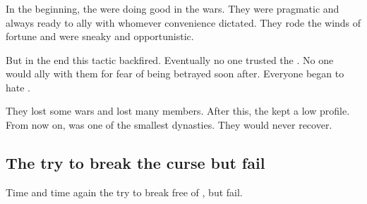\subsubsection{\TiphredSerah}
In the beginning, the \TiphredSerah were doing good in the wars.
They were pragmatic and always ready to ally with whomever convenience dictated.
They rode the winds of fortune and were sneaky and opportunistic. 

But in the end this tactic backfired.
Eventually no one trusted the \TiphredSerah.
No one would ally with them for fear of being betrayed soon after. 
Everyone began to hate \TiphredSerah.

They lost some wars and lost many members.
After this, the kept a low profile. 
From now on, \TiphredSerah was one of the smallest dynasties. 
They would never recover. 









\subsection{The \satharioth{} try to break the curse but fail}
Time and time again the \satharioth{} try to break free of , but fail. 

